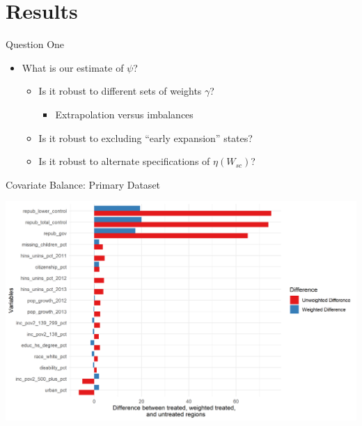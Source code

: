 \documentclass[hyperref={pdfpagelabels=false}]{beamer}
\begin{document}
\section{Results}

\begin{frame}{Question One}
    \begin{itemize}
        \item What is our estimate of $\psi$? \bigskip
        \begin{itemize}
            \item Is it robust to different sets of weights $\gamma$? \bigskip
            \begin{itemize}
                \item Extrapolation versus imbalances \bigskip
            \end{itemize}
            \item Is it robust to excluding ``early expansion'' states? \bigskip
            \item Is it robust to alternate specifications of $\eta(W_{sc})$? \bigskip
        \end{itemize}
    \end{itemize}
\end{frame}

\begin{frame}{Covariate Balance: Primary Dataset}
    \begin{center}
	\includegraphics[scale=0.5]{01_Plots/balance-plot-etuc1.png}
    \end{center}
\end{frame}
\end{document}
